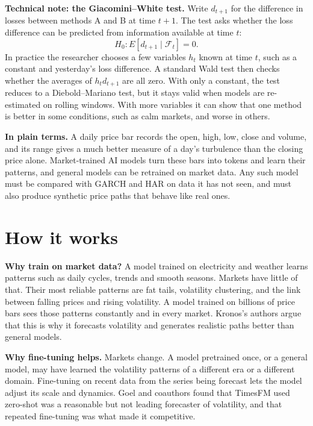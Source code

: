 \begin{technote}
\textbf{Technical note: the Giacomini--White test.} Write $d_{t+1}$ for the difference in losses between methods A and B at time $t+1$. The test asks whether the loss difference can be predicted from information available at time $t$:
\begin{equation}
  H_0: E\left[d_{t+1} \mid \mathcal{F}_t\right] = 0.
  \label{eq:23-gw}
\end{equation}
In practice the researcher chooses a few variables $h_t$ known at time $t$, such as a constant and yesterday's loss difference. A standard Wald test then checks whether the averages of $h_t d_{t+1}$ are all zero. With only a constant, the test reduces to a Diebold--Mariano test, but it stays valid when models are re-estimated on rolling windows. With more variables it can show that one method is better in some conditions, such as calm markets, and worse in others.
\end{technote}

\noindent\textbf{In plain terms.} A daily price bar records the open, high, low, close and volume, and its range gives a much better measure of a day's turbulence than the closing price alone. Market-trained AI models turn these bars into tokens and learn their patterns, and general models can be retrained on market data. Any such model must be compared with GARCH and HAR on data it has not seen, and must also produce synthetic price paths that behave like real ones.

\section{How it works}
\label{sec:23-how}

\textbf{Why train on market data?} A model trained on electricity and weather learns patterns such as daily cycles, trends and smooth seasons. Markets have little of that. Their most reliable patterns are fat tails, volatility clustering, and the link between falling prices and rising volatility. A model trained on billions of price bars sees those patterns constantly and in every market. Kronos's authors argue that this is why it forecasts volatility and generates realistic paths better than general models.

\textbf{Why fine-tuning helps.} Markets change. A model pretrained once, or a general model, may have learned the volatility patterns of a different era or a different domain. Fine-tuning on recent data from the series being forecast lets the model adjust its scale and dynamics. Goel and coauthors found that TimesFM used zero-shot was a reasonable but not leading forecaster of volatility, and that repeated fine-tuning was what made it competitive.

